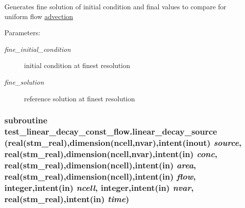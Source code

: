 Generates fine solution of initial condition and final values to compare for uniform flow \hyperlink{a00052}{advection} \begin{Desc}
\item[Parameters:]
\begin{description}
\item[{\em fine\_\-initial\_\-condition}]initial condition at finest resolution\item[{\em fine\_\-solution}]reference solution at finest resolution \end{description}
\end{Desc}
\hypertarget{a00088_cd44223079c62cf775325127c909c86e}{
\subsubsection[{linear\_\-decay\_\-source}]{\setlength{\rightskip}{0pt plus 5cm}subroutine test\_\-linear\_\-decay\_\-const\_\-flow.linear\_\-decay\_\-source (real(stm\_\-real),dimension(ncell,nvar),intent(inout) {\em source}, \/  real(stm\_\-real),dimension(ncell,nvar),intent(in) {\em conc}, \/  real(stm\_\-real),dimension(ncell),intent(in) {\em area}, \/  real(stm\_\-real),dimension(ncell),intent(in) {\em flow}, \/  integer,intent(in) {\em ncell}, \/  integer,intent(in) {\em nvar}, \/  real(stm\_\-real),intent(in) {\em time})}}
\label{a00088_cd44223079c62cf775325127c909c86e}


